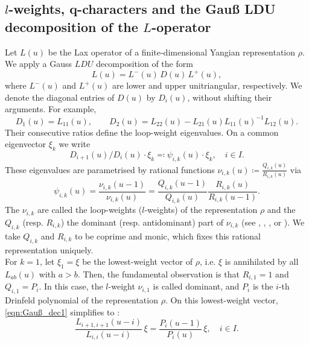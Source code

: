 \documentclass[12pt,reqno]{amsart}
\numberwithin{equation}{section}
\begin{document}
    \subsection{\texorpdfstring{$l$}{l}-weights, q-characters and the Gauß LDU decomposition of the \texorpdfstring{$L$}{L}-operator}
	\label{subsec:loop_weight_conventions}
    Let $L(u)$ be the Lax operator of a finite-dimensional Yangian
    representation $\rho$. We apply a Gauss $LDU$ decomposition of the form
	\begin{equation}
		L(u) = L^-(u)\, D(u) \, L^+(u),
	\end{equation}
	where $L^-(u)$ and $L^+(u)$ are lower and upper unitriangular,
    respectively. We denote the diagonal entries of $D(u)$ by
    $D_i(u)$, without shifting their arguments. For example,
    \begin{equation*}
        D_1(u)=L_{11}(u),\qquad
        D_2(u)=L_{22}(u)-L_{21}(u)L_{11}(u)^{-1}L_{12}(u).
    \end{equation*}
    Their consecutive ratios define the loop-weight eigenvalues. On a
    common eigenvector $\xi_k$ we write
	\begin{equation}
		D_{i+1}(u)/D_i(u) \cdot \xi_k \eqqcolon \psi_{i,k}(u)\cdot \xi_k ,\quad i\in I.\label{eqn:Gauß_dec1}
	\end{equation}
	These eigenvalues are parametrised by rational functions $\nu_{i,k}(u) \coloneqq \frac{Q_{i,k}(u)}{R_{i,k}(u)}$ via
	\begin{equation}
		\psi_{i,k}(u) = \frac{\nu_{i,k}(u-1)}{\nu_{i,k}(u)} = \frac{Q_{i,k}(u-1)}{Q_{i,k}(u)}\frac{R_{i,k}(u)}{R_{i,k}(u-1)}\label{eqn:Gauß_dec2}.
	\end{equation}
	The $\nu_{i,k}$ are called the loop-weights {($l$-weights)} of the representation $\rho$ and the $Q_{i,k}$ (resp. $R_{i,k}$) the dominant (resp. antidominant) part of $\nu_{i,k}$ (see \cite{NT1998}, \cite{FR}, \cite{FM}, or \cite{JuergensMaster}). We take $Q_{i,k}$ and $R_{i,k}$ to be coprime and monic, which fixes this rational representation uniquely.\\
	For $k=1$, let $\xi_1 = \xi$ be the
    lowest-weight vector of $\rho$, i.e. $\xi$ is annihilated by all $L_{ab}(u)$ with $a>b$. Then, the fundamental observation is that $R_{i,1} = 1$ and $Q_{i,1} = P_i$. In this case, the $l$-weight $\nu_{i,1}$ is called dominant, and $P_i$ is the $i$-th Drinfeld polynomial of the representation $\rho$.
    On this lowest-weight vector, \eqref{eqn:Gauß_dec1} simplifies to
    \cite{Drinfeld1988,NT1998}:
	\begin{equation}
		\frac{L_{i+1,i+1}(u-i)}{L_{i,i}(u-i)}\,\xi = \frac{P_i(u-1)}{P_i(u)}\,\xi,\quad i\in I \label{eqn:Shifted_L_ii_to_Drin_polys_direct}.
	\end{equation}
\end{document}

